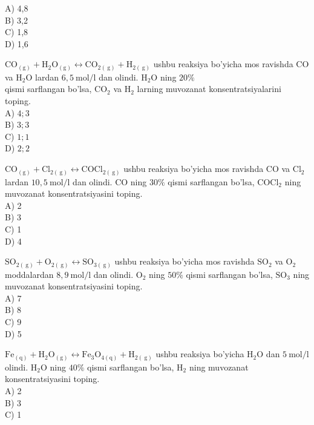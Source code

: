A) 4,8\\
B) 3,2\\
C) 1,8\\
D) 1,6
  \item $\mathrm{CO}_{(\mathrm{g})}+\mathrm{H}_{2} \mathrm{O}_{(\mathrm{g})} \leftrightarrow \mathrm{CO}_{2(\mathrm{~g})}+\mathrm{H}_{2(\mathrm{~g})}$ ushbu reaksiya bo'yicha mos ravishda CO va $\mathrm{H}_{2} \mathrm{O}$ lardan $6,5 \mathrm{~mol} / \mathrm{l}$ dan olindi. $\mathrm{H}_{2} \mathrm{O}$ ning $20 \%$\\qismi sarflangan bo'lsa, $\mathrm{CO}_{2}$ va $\mathrm{H}_{2}$ larning muvozanat konsentratsiyalarini toping.\\
A) $4 ; 3$\\
B) $3 ; 3$\\
C) $1 ; 1$\\
D) $2 ; 2$
  \item $\mathrm{CO}_{(\mathrm{g})}+\mathrm{Cl}_{2(\mathrm{~g})} \leftrightarrow \mathrm{COCl}_{2(\mathrm{~g})}$ ushbu reaksiya bo'yicha mos ravishda CO va $\mathrm{Cl}_{2}$ lardan $10,5 \mathrm{~mol} / \mathrm{l}$ dan olindi. CO ning $30 \%$ qismi sarflangan bo'lsa, $\mathrm{COCl}_{2}$ ning muvozanat konsentratsiyasini toping.\\
A) 2\\
B) 3\\
C) 1\\
D) 4
  \item $\mathrm{SO}_{2(\mathrm{~g})}+\mathrm{O}_{2(\mathrm{~g})} \leftrightarrow \mathrm{SO}_{3(\mathrm{~g})}$ ushbu reaksiya bo'yicha mos ravishda $\mathrm{SO}_{2}$ va $\mathrm{O}_{2}$ moddalardan $8,9 \mathrm{~mol} / \mathrm{l}$ dan olindi. $\mathrm{O}_{2}$ ning $50 \%$ qismi sarflangan bo'lsa, $\mathrm{SO}_{3}$ ning muvozanat konsentratsiyasini toping.\\
A) 7\\
B) 8\\
C) 9\\
D) 5
  \item $\mathrm{Fe}_{(\mathrm{q})}+\mathrm{H}_{2} \mathrm{O}_{(\mathrm{g})} \leftrightarrow \mathrm{Fe}_{3} \mathrm{O}_{4(\mathrm{q})}+\mathrm{H}_{2(\mathrm{~g})}$ ushbu reaksiya bo'yicha $\mathrm{H}_{2} \mathrm{O}$ dan $5 \mathrm{~mol} / \mathrm{l}$ olindi. $\mathrm{H}_{2} \mathrm{O}$ ning $40 \%$ qismi sarflangan bo'lsa, $\mathrm{H}_{2}$ ning muvozanat konsentratsiyasini toping.\\
A) 2\\
B) 3\\
C) 1\\
